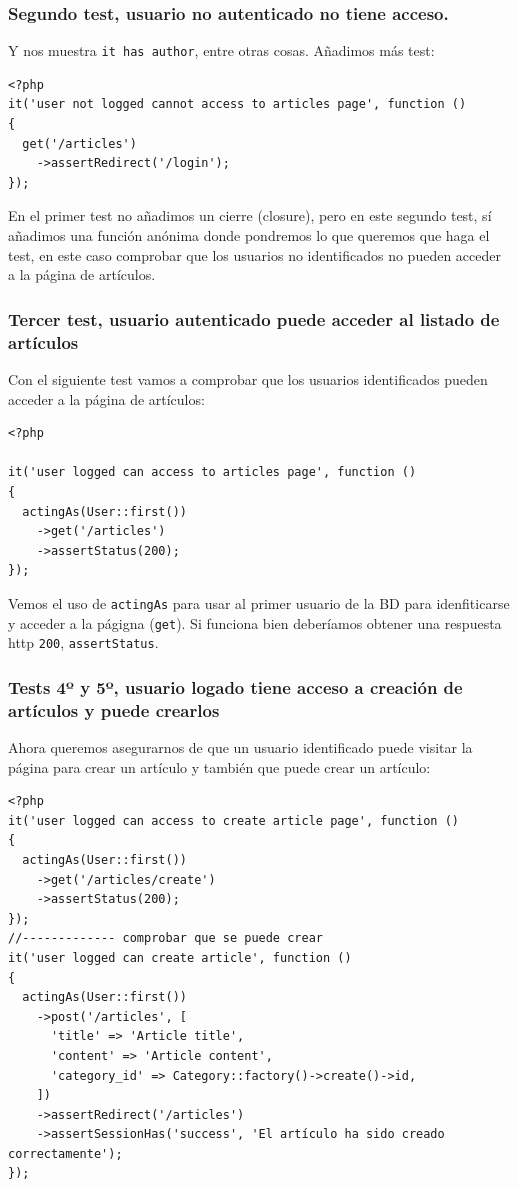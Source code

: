 \documentclass[11pt]{article}
\begin{document}
\subsubsection{Segundo test, usuario no autenticado no tiene acceso.}
\label{sec:orgf69da2a}
Y nos muestra \texttt{it has author}, entre otras cosas.
Añadimos más test:
\begin{verbatim}
<?php
it('user not logged cannot access to articles page', function ()
{
  get('/articles')
    ->assertRedirect('/login');
});
\end{verbatim}

En el primer test no añadimos un cierre (closure), pero en este
segundo test, sí añadimos una función anónima donde pondremos lo que
queremos que haga el test, en este caso comprobar que los usuarios no
identificados no pueden acceder a la página de artículos.

\subsubsection{Tercer test, usuario autenticado puede acceder al listado de artículos}
\label{sec:orgc8ffa11}
Con el siguiente test vamos a comprobar que los usuarios identificados
pueden acceder a la página de artículos:
\begin{verbatim}
<?php

it('user logged can access to articles page', function ()
{
  actingAs(User::first())
    ->get('/articles')
    ->assertStatus(200);
});
\end{verbatim}

Vemos el uso de \texttt{actingAs} para usar al primer usuario de la BD para
idenfiticarse y acceder a la págigna (\texttt{get}). Si funciona bien
deberíamos obtener una respuesta http \texttt{200}, \texttt{assertStatus}.

\subsubsection{Tests 4º y 5º, usuario logado tiene acceso a creación de artículos y puede crearlos}
\label{sec:org5a7184f}
Ahora queremos asegurarnos de que un usuario identificado puede
visitar la página para crear un artículo y también que puede crear un
artículo:
\begin{verbatim}
<?php
it('user logged can access to create article page', function ()
{
  actingAs(User::first())
    ->get('/articles/create')
    ->assertStatus(200);
});
//------------- comprobar que se puede crear
it('user logged can create article', function ()
{
  actingAs(User::first())
    ->post('/articles', [
      'title' => 'Article title',
      'content' => 'Article content',
      'category_id' => Category::factory()->create()->id,
    ])
    ->assertRedirect('/articles')
    ->assertSessionHas('success', 'El artículo ha sido creado correctamente');
});
\end{verbatim}
\end{document}
